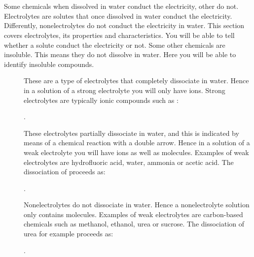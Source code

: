 \documentclass[main.tex]{subfiles}
\begin{document}
\section{\color{blue!30!black}{Electrolytes and insoluble compounds}}
Some chemicals when dissolved in water conduct the electricity, other do not. Electrolytes are solutes that once dissolved in water conduct the electricity. Differently, nonelectrolytes do not conduct the electricity in water. This section covers electrolytes, its properties and characteristics. You will be able to tell whether a solute conduct the electricity or not. Some other chemicals are insoluble. This means they do not dissolve in water. Here you will be able to identify insoluble compounds.
\sloppy 
\begin{description}
\item[] These are a type of electrolytes that completely dissociate in water. Hence in a solution of a strong electrolyte you will only have ions. Strong electrolytes are typically ionic compounds such as :
\begin{center}.\end{center}
\item[] These electrolytes partially dissociate in water, and this is indicated by means of a chemical reaction with a double arrow. Hence in a solution of a weak electrolyte you will have ions as well as molecules. Examples of weak electrolytes are hydrofluoric acid, water, ammonia or acetic acid. The dissociation of  proceeds as:
\begin{center}.\end{center}
\item[] Nonelectrolytes do not dissociate in water. Hence a nonelectrolyte solution only contains molecules. Examples of weak electrolytes are carbon-based chemicals such as methanol, ethanol, urea or sucrose. The dissociation of urea for example  proceeds as:
\begin{center}.\end{center}


\end{description}
\end{document}
